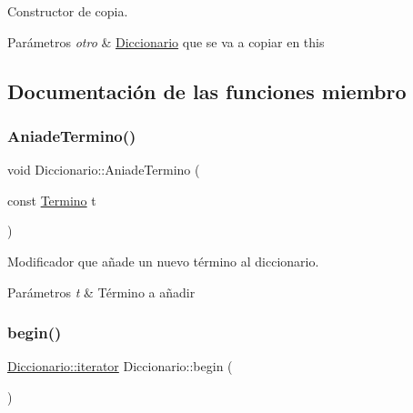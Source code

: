 Constructor de copia. 


\begin{DoxyParams}{Parámetros}
{\em otro} & \hyperlink{classDiccionario}{Diccionario} que se va a copiar en this \\
\hline
\end{DoxyParams}


\subsection{Documentación de las funciones miembro}
\mbox{\label{classDiccionario_a95512d5b0735da4a1dc53aa3cd97f730}} 
\subsubsection{\texorpdfstring{Aniade\+Termino()}{AniadeTermino()}}
{\footnotesize\ttfamily void Diccionario\+::\+Aniade\+Termino (\begin{DoxyParamCaption}\item[{const \hyperlink{classTermino}{Termino}}]{t }\end{DoxyParamCaption})}



Modificador que añade un nuevo término al diccionario. 


\begin{DoxyParams}{Parámetros}
{\em t} & Término a añadir \\
\hline
\end{DoxyParams}
\mbox{\label{classDiccionario_ab270eb969d580f01b358e648a3061ac4}} 
\subsubsection{\texorpdfstring{begin()}{begin()}\hspace{0.1cm}{\footnotesize\ttfamily [1/2]}}
{\footnotesize\ttfamily \hyperlink{classDiccionario_a91820df8d3ba094a119e4ad5af589156}{Diccionario\+::iterator} Diccionario\+::begin (\begin{DoxyParamCaption}{ }\end{DoxyParamCaption})}




